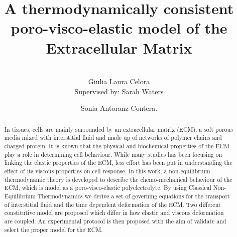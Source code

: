 \documentclass[runningheads]{llncs}
\begin{document}
%
\title{A thermodynamically consistent poro-visco-elastic model of the Extracellular Matrix}
%
%
\author{\\[0.2cm] Giulia Laura Celora \\[0.5cm]{\normalfont Supervised by:} Sarah Waters  \and Sonia Antoranz Contera. }
%
%
\maketitle              %
%
\begin{abstract}
In tissues, cells are mainly surrounded by an extracellular matrix (ECM), a soft porous media mixed with interstitial fluid and made up of networks of polymer chains and charged protein. It is known that the physical and biochemical properties of the ECM play a role in determining cell behaviour. While many studies has been focusing on linking the elastic properties of the ECM, less effort has been put in understanding the effect of its viscous properties on cell response. In this work, a non-equilibrium thermodynamic theory is developed to describe the chemo-mechanical behaviour of the ECM, which is model as a poro-visco-elastic polyelectrolyte. By using Classical Non-Equilibrium Thermodynamics we derive a set of governing equations for the transport of interstitial fluid and the time dependent deformation of the ECM. Two different constitutive model are proposed which differ in how elastic and viscous deformation are coupled. An experimental protocol is then proposed with the aim of validate and select the proper model for the ECM.
\end{abstract}
%
%
%

\end{document}
